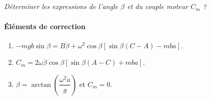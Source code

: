 \documentclass[10pt,fleqn]{article} %
\begin{document}
\begin{multicols}{2}
\subparagraph{}
\textit{Déterminer les expressions de l’angle $\beta$ et du couple moteur $C_m$ ?}
\ifprof
\begin{corrige}
\end{corrige}
\else
\fi

\vspace{1cm}
\paragraph*{Éléments de correction}
\footnotesize
\begin{enumerate}
\item $-mgb\sin \beta = B\ddot{\beta}+\omega^2 \cos\beta \left[\sin\beta\left(C-A\right)-mba\right]$.
\item $C_m=2\omega\dot{\beta}\cos\beta  \left[\sin\beta\left(A-C\right)+mba\right]$.
\item $\beta=\arctan\left( \dfrac{\omega^2 a}{g}\right)$ et $C_m=0$.
\end{enumerate}
\normalsize
\end{multicols}
\end{document}
